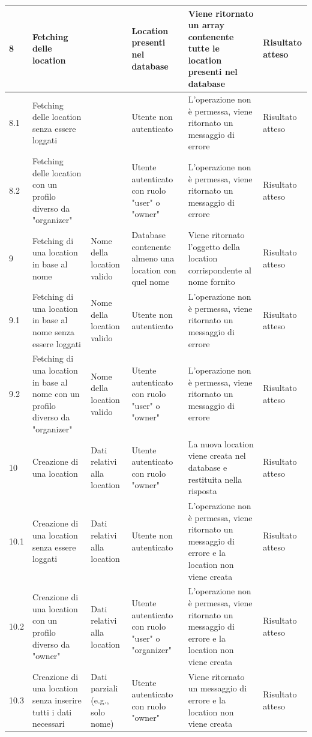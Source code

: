 \documentclass[9pt]{extarticle}
\begin{document}
\newpage

\begin{table}[!htb]
	\centering
	\renewcommand{\arraystretch}{1.7} %
	\setlength{\tabcolsep}{6pt} %
	\resizebox{\textwidth}{!}
	{%
	\begin{tabular}{p{.5cm} p{3.5cm} p{2.5cm} p{2.5cm} p{5cm} p{1.5cm}}
	\toprule
	8 & Fetching delle location &  & Location presenti nel database & Viene ritornato un array contenente tutte le location presenti nel database & Risultato atteso \\\midrule
	8.1 & Fetching delle location senza essere loggati &  & Utente non autenticato & L'operazione non è permessa, viene ritornato un messaggio di errore & Risultato atteso \\\midrule
	8.2 & Fetching delle location con un profilo diverso da "organizer" &  & Utente autenticato con ruolo "user" o "owner" & L'operazione non è permessa, viene ritornato un messaggio di errore & Risultato atteso \\\midrule
	9 & Fetching di una location in base al nome & Nome della location valido & Database contenente almeno una location con quel nome & Viene ritornato l'oggetto della location corrispondente al nome fornito & Risultato atteso \\\midrule
	9.1 & Fetching di una location in base al nome senza essere loggati & Nome della location valido & Utente non autenticato & L'operazione non è permessa, viene ritornato un messaggio di errore& Risultato atteso \\\midrule
	9.2 & Fetching di una location in base al nome con un profilo diverso da "organizer" & Nome della location valido & Utente autenticato con ruolo "user" o "owner" & L'operazione non è permessa, viene ritornato un messaggio di errore & Risultato atteso \\\midrule
	10 & Creazione di una location & Dati relativi alla location & Utente autenticato con ruolo "owner" & La nuova location viene creata nel database e restituita nella risposta & Risultato atteso \\\midrule
	10.1 & Creazione di una location senza essere loggati & Dati relativi alla location & Utente non autenticato & L'operazione non è permessa, viene ritornato un messaggio di errore e la location non viene creata & Risultato atteso \\\midrule
	10.2 & Creazione di una location con un profilo diverso da "owner" & Dati relativi alla location & Utente autenticato con ruolo "user" o "organizer" & L'operazione non è permessa, viene ritornato un messaggio di errore e la location non viene creata & Risultato atteso \\\midrule
	10.3 & Creazione di una location senza inserire tutti i dati necessari & Dati parziali (e.g., solo nome) & Utente autenticato con ruolo "owner" & Viene ritornato un messaggio di errore e la location non viene creata & Risultato atteso \\\bottomrule
	

\end{tabular}}
\end{table}
\end{document}
